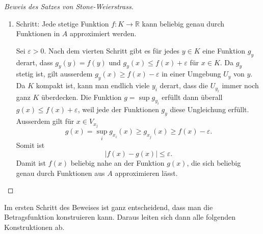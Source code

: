 \begin{proof}[Beweis des Satzes von Stone-Weierstrass]
\begin{enumerate}
Zu jedem $z\in K$ gibt es eine Funktion $h_z\in A$ mit
$h_z(x)=f(x)$ und $h_z(z) \le f(z)+\frac12\varepsilon$.
Wegen der Stetigkeit von $h_z$ gibt es eine Umgebung $V_z$ von $z$, in der
immer noch gilt $h_z(y)\le f(y)+\varepsilon$ für $y\in V_z$.
Wegen der Kompaktheit von $K$ kann man endlich viele Punkte $z_i$ wählen
derart, dass die $V_{z_i}$ immer noch $K$ überdecken.
Dann erfüllt die Funktion
\(
g(z) = \inf h_{z_i}
\)
die Bedingungen $g(x) = f(x)$ und für $z\in V_{z_i}$
\[
g(z) = \inf_{j} h_{z_j}(z) \le h_{z_i}(z) \le f(z)+\varepsilon.
\]
Ausserdem ist $g(z)$ nach dem zweiten Schritt beliebig genau durch
Funktionen in $A$ approximierbar.
\item Schritt: Jede stetige Funktion $f\colon K\to\mathbb{R}$ kann
beliebig genau durch Funktionen in $A$ approximiert werden.

Sei $\varepsilon > 0$.
Nach dem vierten Schritt gibt es für jedes $y\in K$ eine Funktion $g_y$
derart, dass $g_y(y)=f(y)$  und $g_y(x) \le f(x) + \varepsilon$ für
$x\in K$.
Da $g_y$ stetig ist, gilt ausserdem $g_y(x) \ge f(x) -\varepsilon$ in
einer Umgebung $U_y$ von $y$.
Da $K$ kompakt ist, kann man endlich viele $y_i$ derart, dass die $U_{y_i}$
immer noch ganz $K$ überdecken.
Die Funktion $g=\sup g_{y_i}$ erfüllt dann überall $g(x) \le f(x)+\varepsilon$,
weil jede der Funktionen $g_y$ diese Ungleichung erfüllt.
Ausserdem gilt für $x\in V_{x_j}$
\[
g(x) = \sup_i g_{x_i}(x) \ge g_{x_j}(x) \ge f(x)-\varepsilon.
\]
Somit ist
\[
|f(x)-g(x)| \le \varepsilon.
\]
Damit ist $f(x)$ beliebig nahe an der Funktion $g(x)$, die sich 
beliebig genau durch Funktionen aus $A$ approximieren lässt.
\qedhere
\end{enumerate}
\end{proof}

Im ersten Schritt des Beweises ist ganz entscheidend, dass man die
Betragsfunktion konstruieren kann.
Daraus leiten sich dann alle folgenden Konstruktionen ab.

